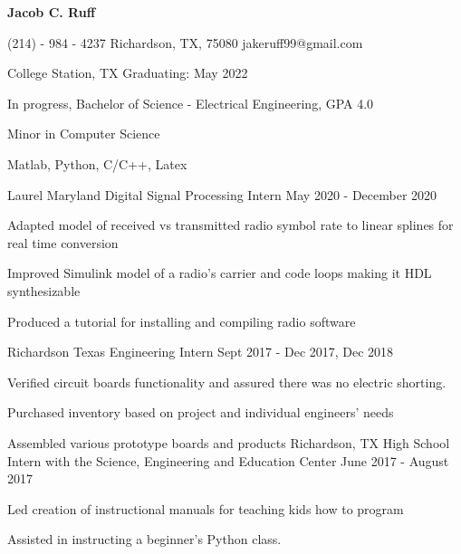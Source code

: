 \documentclass[11pt]{article} %
\begin{document}
\centerline{{\Huge \bf Jacob C. Ruff}}

\bigskip

	{(214) - 984 - 4237}
        {Richardson, TX, 75080}
        {jakeruff99@gmail.com}


\begin{description}
\squish
{}
           {College Station, TX}
           {Graduating: May 2022}


In progress, Bachelor of Science - Electrical Engineering, GPA 4.0

Minor in Computer Science

\end{description}


      {Matlab, Python, C/C++, Latex}



\begin{description}
\squish

	   {Laurel Maryland}
           {Digital Signal Processing Intern}
           {May 2020 - December 2020}

	   Adapted model of received  vs transmitted radio symbol rate to linear splines for real time conversion

	   Improved Simulink model of a radio's carrier and code loops making it HDL synthesizable

	   Produced a tutorial for installing and compiling radio software

	   {Richardson Texas}
           {Engineering Intern}
           {Sept 2017 - Dec 2017, Dec 2018}

	Verified circuit boards functionality and assured there was no electric shorting.

	Purchased inventory based on project and individual engineers' needs

	Assembled various prototype boards and products
		{Richardson, TX}
		{High School Intern with the Science, Engineering and Education Center}
		{June 2017 - August 2017}

		Led creation of instructional manuals for teaching kids how to program

		Assisted in instructing a beginner's Python class.

\end{description}
\end{document}
